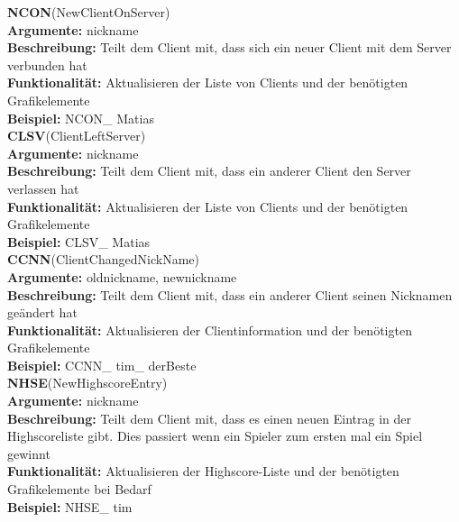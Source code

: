 \documentclass[a4paper, 12pt, oneside, headsepline=.5pt,footsepline=.5pt]{scrartcl}
\begin{document}
{\large \textbf{NCON}(NewClientOnServer)} \\
\hspace{4ex} \textbf{Argumente:} {nickname} \\
\hspace{4ex} \textbf{Beschreibung:} {Teilt dem Client mit, dass sich ein neuer Client mit dem Server verbunden hat} \\
\hspace{4ex} \textbf{Funktionalität:} {Aktualisieren der Liste von Clients und der benötigten Grafikelemente}  \\
\hspace{4ex} \textbf{Beispiel:} {NCON\_ Matias} \\

{\large \textbf{CLSV}(ClientLeftServer)} \\
\hspace{4ex} \textbf{Argumente:} {nickname} \\
\hspace{4ex} \textbf{Beschreibung:} {Teilt dem Client mit, dass ein anderer Client den Server verlassen hat} \\
\hspace{4ex} \textbf{Funktionalität:} {Aktualisieren der Liste von Clients und der benötigten Grafikelemente}  \\
\hspace{4ex} \textbf{Beispiel:} {CLSV\_ Matias} \\

{\large \textbf{CCNN}(ClientChangedNickName)} \\
\hspace{4ex} \textbf{Argumente:} {oldnickname, newnickname} \\
\hspace{4ex} \textbf{Beschreibung:} {Teilt dem Client mit, dass ein anderer Client seinen Nicknamen geändert hat} \\
\hspace{4ex} \textbf{Funktionalität:} {Aktualisieren der Clientinformation und der benötigten Grafikelemente}  \\
\hspace{4ex} \textbf{Beispiel:} {CCNN\_ tim\_ derBeste} \\

{\large \textbf{NHSE}(NewHighscoreEntry)} \\
\hspace{4ex} \textbf{Argumente:} {nickname} \\
\hspace{4ex} \textbf{Beschreibung:} {Teilt dem Client mit, dass es einen neuen Eintrag in der Highscoreliste gibt. Dies passiert wenn ein Spieler zum ersten mal ein Spiel gewinnt} \\
\hspace{4ex} \textbf{Funktionalität:} {Aktualisieren der Highscore-Liste und der benötigten Grafikelemente bei Bedarf} \\
\hspace{4ex} \textbf{Beispiel:} {NHSE\_ tim} \\
\end{document}
